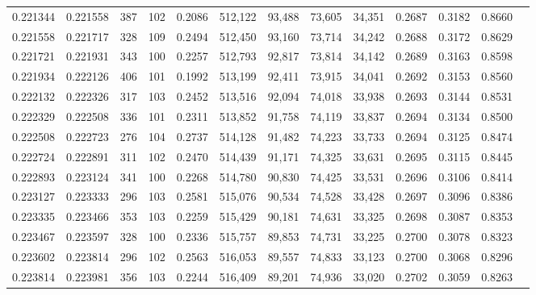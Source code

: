 \begin{tabular}{rrrrrrrrrrrrr}
0.221344 & 0.221558 &   387 & 102 &                                     0.2086 & 512,122 &  93,488 &  73,605 &  34,351 & 0.2687 & 0.3182 & 0.8660 \\
0.221558 & 0.221717 &   328 & 109 &                                     0.2494 & 512,450 &  93,160 &  73,714 &  34,242 & 0.2688 & 0.3172 & 0.8629 \\
0.221721 & 0.221931 &   343 & 100 &                                     0.2257 & 512,793 &  92,817 &  73,814 &  34,142 & 0.2689 & 0.3163 & 0.8598 \\
0.221934 & 0.222126 &   406 & 101 &                                     0.1992 & 513,199 &  92,411 &  73,915 &  34,041 & 0.2692 & 0.3153 & 0.8560 \\
0.222132 & 0.222326 &   317 & 103 &                                     0.2452 & 513,516 &  92,094 &  74,018 &  33,938 & 0.2693 & 0.3144 & 0.8531 \\
0.222329 & 0.222508 &   336 & 101 &                                     0.2311 & 513,852 &  91,758 &  74,119 &  33,837 & 0.2694 & 0.3134 & 0.8500 \\
0.222508 & 0.222723 &   276 & 104 &                                     0.2737 & 514,128 &  91,482 &  74,223 &  33,733 & 0.2694 & 0.3125 & 0.8474 \\
0.222724 & 0.222891 &   311 & 102 &                                     0.2470 & 514,439 &  91,171 &  74,325 &  33,631 & 0.2695 & 0.3115 & 0.8445 \\
0.222893 & 0.223124 &   341 & 100 &                                     0.2268 & 514,780 &  90,830 &  74,425 &  33,531 & 0.2696 & 0.3106 & 0.8414 \\
0.223127 & 0.223333 &   296 & 103 &                                     0.2581 & 515,076 &  90,534 &  74,528 &  33,428 & 0.2697 & 0.3096 & 0.8386 \\
0.223335 & 0.223466 &   353 & 103 &                                     0.2259 & 515,429 &  90,181 &  74,631 &  33,325 & 0.2698 & 0.3087 & 0.8353 \\
0.223467 & 0.223597 &   328 & 100 &                                     0.2336 & 515,757 &  89,853 &  74,731 &  33,225 & 0.2700 & 0.3078 & 0.8323 \\
0.223602 & 0.223814 &   296 & 102 &                                     0.2563 & 516,053 &  89,557 &  74,833 &  33,123 & 0.2700 & 0.3068 & 0.8296 \\
0.223814 & 0.223981 &   356 & 103 &                                     0.2244 & 516,409 &  89,201 &  74,936 &  33,020 & 0.2702 & 0.3059 & 0.8263 \\

\end{tabular}
